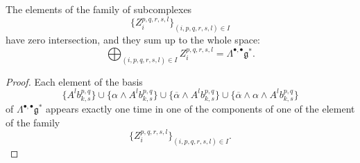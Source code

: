 \documentclass[10pt,a4paper]{amsart}
\begin{document}
\begin{Property}
The elements of the family of subcomplexes
\[
\{
Z_i^{p, q, r, s, l}
\}_{(i, p, q, r, s, l) \in I}
\]
have zero intersection, and they sum up to the whole space:
\[
\bigoplus_{(i, p, q, r, s, l) \in I}
Z_i^{p, q, r, s, l}
=
\Lambda^{\bullet, \bullet}\mathfrak{g}^*.
\]
\end{Property}

\begin{proof}
Each element of the basis
\[
\{
A^lb_{k, s}^{p, q}
\}
\cup
\{
\alpha \wedge A^lb_{k, s}^{p, q}
\}
\cup
\{
\overline{\alpha} \wedge A^lb_{k, s}^{p, q}
\}
\cup
\{
\overline{\alpha} \wedge \alpha \wedge A^lb_{k, s}^{p, q}
\}
\]
of $\Lambda^{\bullet, \bullet}\mathfrak{g}^*$ appears exactly one time in one of the components of one of the element of the family
\[
\{
Z_i^{p, q, r, s, l}
\}_{(i, p, q, r, s, l) \in I}.
\]
\end{proof}
\end{document}
